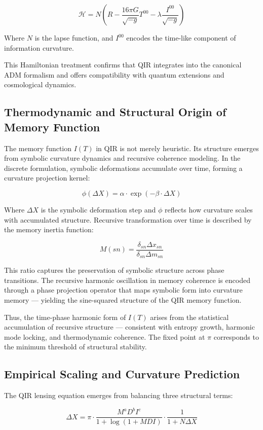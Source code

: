 \documentclass[11pt]{article}
\begin{document}
\[
\mathcal{H} = N \left( R - \frac{16 \pi G}{\sqrt{-g}} T^{00} - \lambda \frac{I^{00}}{\sqrt{-g}} \right)
\]

Where \(N\) is the lapse function, and \(I^{00}\) encodes the time-like component of information curvature.


This Hamiltonian treatment confirms that QIR integrates into the canonical ADM formalism and offers compatibility with quantum extensions and cosmological dynamics.

\subsection{Thermodynamic and Structural Origin of Memory Function}

The memory function \( I(T) \) in QIR is not merely heuristic. Its structure emerges from symbolic curvature dynamics and recursive coherence modeling. In the discrete formulation, symbolic deformations accumulate over time, forming a curvature projection kernel:

\[
\phi(\Delta X) = \alpha \cdot \exp(-\beta \cdot \Delta X)
\]

Where \(\Delta X\) is the symbolic deformation step and \(\phi\) reflects how curvature scales with accumulated structure. Recursive transformation over time is described by the memory inertia function:

\[
M(sn) = \frac{\delta_{sn} \Delta x_{sn}}{\delta_{sn} \Delta m_{sn}}
\]

This ratio captures the preservation of symbolic structure across phase transitions. The recursive harmonic oscillation in memory coherence is encoded through a phase projection operator that maps symbolic form into curvature memory — yielding the sine-squared structure of the QIR memory function.

Thus, the time-phase harmonic form of \( I(T) \) arises from the statistical accumulation of recursive structure — consistent with entropy growth, harmonic mode locking, and thermodynamic coherence. The fixed point at \( \pi \) corresponds to the minimum threshold of structural stability.

\subsection{Empirical Scaling and Curvature Prediction}

The QIR lensing equation emerges from balancing three structural terms:

\[
\Delta X = \pi \cdot \frac{M^a D^b I^c}{1 + \log(1 + MDI)} \cdot \frac{1}{1 + N \Delta X}
\]
\end{document}
